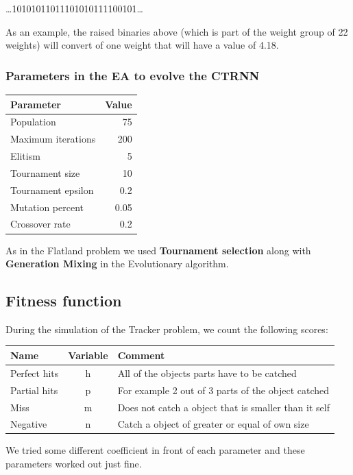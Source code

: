 \begin{center}
\dots101010110{\LARGE11101010}111100101\dots
\end{center}

As an example, the raised binaries above (which is part of the weight group of 22 weights) will convert of one weight that will have a value of 4.18.

\subsubsection{Parameters in the EA to evolve the CTRNN}
\begin{center}
\begin{tabular}{p{5cm} | r}
\textbf{Parameter} & \textbf{Value} \\
\hline
Population & 75 \\
Maximum iterations & 200 \\
Elitism & 5 \\
Tournament size & 10 \\
Tournament epsilon & 0.2 \\
Mutation percent & 0.05 \\
Crossover rate & 0.2 \\
\hline
\end{tabular}
\end{center}

As in the Flatland problem we used \textbf{Tournament selection} along with \textbf{Generation Mixing} in the Evolutionary algorithm.

\subsection{Fitness function}
During the simulation of the Tracker problem, we count the following scores:

\begin{tabular}{l | c | l}
\textbf{Name} & \textbf{Variable} & \textbf{Comment} \\
\hline
Perfect hits & h & All of the objects parts have to be catched \\
Partial hits & p & For example 2 out of 3 parts of the object catched \\
Miss & m & Does not catch a object that is smaller than it self \\
Negative & n & Catch a object of greater or equal of own size \\
\hline
\end{tabular}

We tried some different coefficient in front of each parameter and these parameters worked out just fine.

